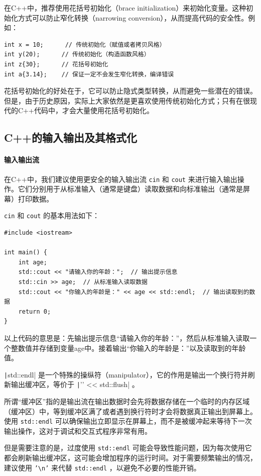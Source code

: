 在C++中，推荐使用花括号初始化（brace initialization）来初始化变量。这种初始化方式可以防止窄化转换（narrowing conversion），从而提高代码的安全性。例如：
\begin{verbatim}
int x = 10;      // 传统初始化（赋值或者拷贝风格）
int y(20);      // 传统初始化（构造函数风格）
int z{30};      // 花括号初始化
int a{3.14};    // 保证一定不会发生窄化转换，编译错误
\end{verbatim}
花括号初始化的好处在于，它可以防止隐式类型转换，从而避免一些潜在的错误。但是，由于历史原因，实际上大家依然是更喜欢使用传统初始化方式；只有在很现代的C++代码中，才会大量使用花括号初始化。

\subsection{C++的输入输出及其格式化}

\paragraph{输入输出流}

在C++中，我们建议使用更安全的输入输出流 \texttt{cin} 和 \texttt{cout} 来进行输入输出操作。它们分别用于从标准输入（通常是键盘）读取数据和向标准输出（通常是屏幕）打印数据。

\texttt{cin} 和 \texttt{cout} 的基本用法如下：
\begin{verbatim}
#include <iostream>

int main() {
    int age;
    std::cout << "请输入你的年龄：";  // 输出提示信息
    std::cin >> age;  // 从标准输入读取数据
    std::cout << "你输入的年龄是：" << age << std::endl;  // 输出读取到的数据
    return 0;
}
\end{verbatim}
以上代码的意思是：先输出提示信息“请输入你的年龄：”，然后从标准输入读取一个整数值并存储到变量age中。接着输出“你输入的年龄是：”以及读取到的年龄值。

\texttt|std::endl| 是一个特殊的操纵符（manipulator），它的作用是输出一个换行符并刷新输出缓冲区，等价于 \texttt|'\n' << std::flush| 。

所谓“缓冲区”指的是输出流在输出数据时会先将数据存储在一个临时的内存区域（缓冲区）中，等到缓冲区满了或者遇到换行符时才会将数据真正输出到屏幕上。使用 \texttt{std::endl} 可以确保输出立即显示在屏幕上，而不是被缓冲起来等待下一次输出操作，这对于调试和交互式程序非常有用。

但是需要注意的是，过度使用 \texttt{std::endl} 可能会导致性能问题，因为每次使用它都会刷新输出缓冲区，这可能会增加程序的运行时间。对于需要频繁输出的情况，建议使用 \texttt{'\textbackslash n'} 来代替 \texttt{std::endl} ，以避免不必要的性能开销。

